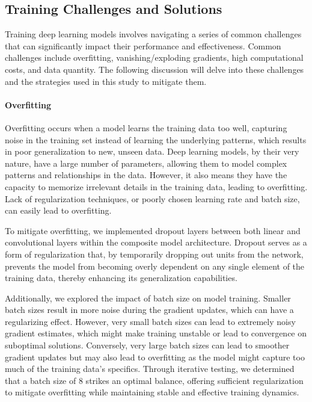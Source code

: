 \subsection{Training Challenges and Solutions}
\label{subsec:4_training_challenges_and_solutions}
Training deep learning models involves navigating a series of common challenges that can significantly impact their performance and effectiveness. Common challenges include overfitting, vanishing/exploding gradients, high computational costs, and data quantity. The following discussion will delve into these challenges and the strategies used in this study to mitigate them.

\paragraph*{Overfitting}
\label{par:4_overfitting}
Overfitting occurs when a model learns the training data too well, capturing noise in the training set instead of learning the underlying patterns, which results in poor generalization to new, unseen data. Deep learning models, by their very nature, have a large number of parameters, allowing them to model complex patterns and relationships in the data. However, it also means they have the capacity to memorize irrelevant details in the training data, leading to overfitting. Lack of regularization techniques, or poorly chosen learning rate and batch size, can easily lead to overfitting.

To mitigate overfitting, we implemented dropout layers between both linear and convolutional layers within the composite model architecture. Dropout serves as a form of regularization that, by temporarily dropping out units from the network, prevents the model from becoming overly dependent on any single element of the training data, thereby enhancing its generalization capabilities.

Additionally, we explored the impact of batch size on model training. Smaller batch sizes result in more noise during the gradient updates, which can have a regularizing effect. However, very small batch sizes can lead to extremely noisy gradient estimates, which might make training unstable or lead to convergence on suboptimal solutions. Conversely, very large batch sizes can lead to smoother gradient updates but may also lead to overfitting as the model might capture too much of the training data's specifics. Through iterative testing, we determined that a batch size of 8 strikes an optimal balance, offering sufficient regularization to mitigate overfitting while maintaining stable and effective training dynamics.

